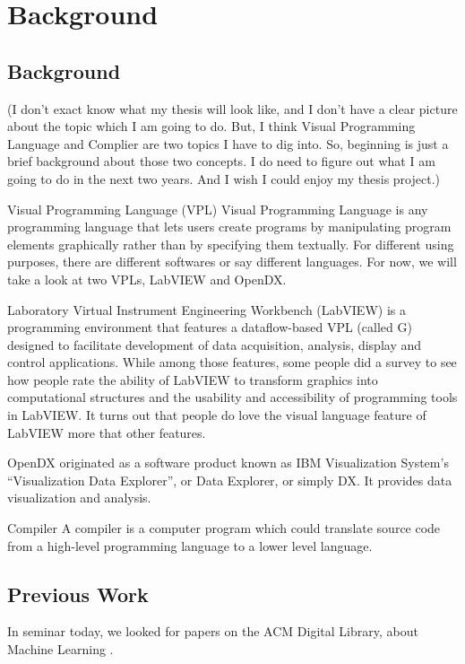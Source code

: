 \chapter{Background}
\label{chap:background}

\section{Background}
(I don’t exact know what my thesis will look like, and I don’t have a clear picture about the topic which I am going to do. But, I think Visual Programming Language and Complier are two topics I have to dig into. So, beginning is just a brief background about those two concepts. I do need to figure out what I am going to do in the next two years. And I wish I could enjoy my thesis project.)

Visual Programming Language (VPL)
Visual Programming Language is any programming language that lets users create programs by manipulating program elements graphically rather than by specifying them textually. For different using purposes, there are different softwares or say different languages. For now, we will take a look at two VPLs, LabVIEW and OpenDX.

Laboratory Virtual Instrument Engineering Workbench (LabVIEW) is a programming environment that features a dataflow-based VPL (called G) designed to facilitate development of data acquisition, analysis, display and control applications.\cite{WHITLEY:2001:VPW:2826730.2826856} While among those features, some people did a survey to see how people rate the ability of LabVIEW to transform graphics into computational structures and the usability and accessibility of programming tools in LabVIEW. It turns out that people do love the visual language feature of LabVIEW more that other features.

OpenDX originated as a software product known as IBM Visualization System’s “Visualization Data Explorer”, or Data Explorer, or simply DX. It provides data visualization and analysis. 

Compiler
A compiler is a computer program which could translate source code from a high-level programming language to a lower level language.

\section{Previous Work}

In seminar today, we looked for papers on the ACM Digital Library, about Machine Learning \cite{Tong:2002:SVM:944790.944793}.
